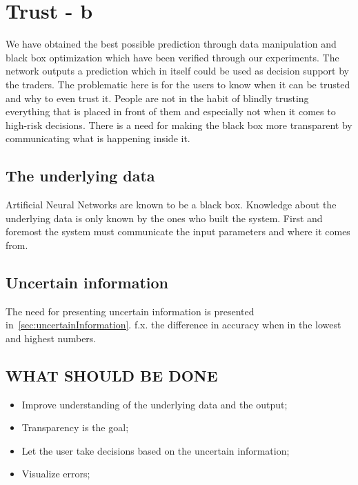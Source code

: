 \section{Trust - b}
We have obtained the best possible prediction through data manipulation and black box optimization which have been verified through our experiments. The network outputs a prediction which in itself could be used as decision support by the traders. The problematic here is for the users to know when it can be trusted and why to even trust it. People are not in the habit of blindly trusting everything that is placed in front of them and especially not when it comes to high-risk decisions. There is a need for making the black box more transparent by communicating what is happening inside it.


\subsection{The underlying data}
Artificial Neural Networks are known to be a black box. Knowledge about the underlying data is only known by the ones who built the system. First and foremost the system must communicate the input parameters and where it comes from.

\subsection{Uncertain information}
The need for presenting uncertain information is presented in~\ref{sec:uncertainInformation}.
f.x. the difference in accuracy when in the lowest and highest numbers.

\subsection{}


\subsection{WHAT SHOULD BE DONE}
\begin{itemize}
\item Improve understanding of the underlying data and the output;
\item Transparency is the goal;
\item Let the user take decisions based on the uncertain information;
\item Visualize errors;
\end{itemize}

